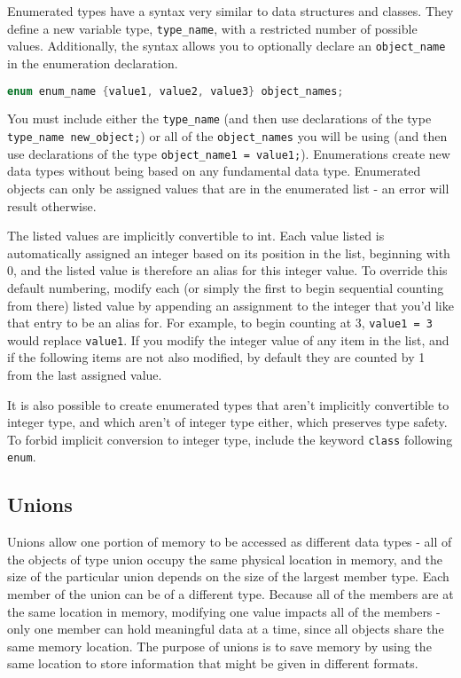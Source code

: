 \documentclass[10pt]{article}
\begin{document}
Enumerated types have a syntax very similar to data structures and classes. They define a new variable type, \texttt{type\_name}, with a restricted number of possible values. Additionally, the syntax allows you to optionally declare an \texttt{object\_name} in the enumeration declaration.

\begin{lstlisting}[language=C++]
enum enum_name {value1, value2, value3} object_names;
\end{lstlisting}

You must include either the \texttt{type\_name} (and then use declarations of the type \texttt{type\_name new\_object;}) or all of the \texttt{object\_names} you will be using (and then use declarations of the type \texttt{object\_name1 = value1;}). Enumerations create new data types without being based on any fundamental data type. Enumerated objects can only be assigned values that are in the enumerated list - an error will result otherwise. 

The listed values are implicitly convertible to int. Each value listed is automatically assigned an integer based on its position in the list, beginning with 0, and the listed value is therefore an alias for this integer value. To override this default numbering, modify each (or simply the first to begin sequential counting from there) listed value by appending an assignment to the integer that you'd like that entry to be an alias for. For example, to begin counting at 3, \texttt{value1 = 3} would replace \texttt{value1}. If you modify the integer value of any item in the list, and if the following items are not also modified, by default they are counted by 1 from the last assigned value.

It is also possible to create enumerated types that aren't implicitly convertible to integer type, and which aren't of integer type either, which preserves type safety. To forbid implicit conversion to integer type, include the keyword \texttt{class} following \texttt{enum}.

\subsection{Unions}

Unions allow one portion of memory to be accessed as different data types - all of the objects of type union occupy the same physical location in memory, and the size of the particular union depends on the size of the largest member type. Each member of the union can be of a different type. Because all of the members are at the same location in memory, modifying one value impacts all of the members - only one member can hold meaningful data at a time, since all objects share the same memory location. The purpose of unions is to save memory by using the same location to store information that might be given in different formats.
\end{document}
